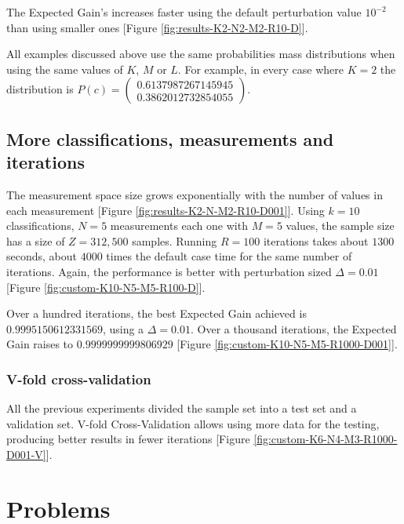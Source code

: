 \documentclass[letterpaper, conference]{IEEEtran}
\begin{document}
The Expected Gain's increases faster using the default perturbation value $10^{-2}$ than using smaller ones [Figure \ref{fig:results-K2-N2-M2-R10-D}].



All examples discussed above use the same probabilities mass distributions when using the same values of $K$, $M$ or $L$. For example, in every case where $K = 2$ the distribution is $P(c) = \begin{pmatrix}0.6137987267145945\\0.3862012732854055\end{pmatrix}$.

\subsection{More classifications, measurements and iterations}

The measurement space size grows exponentially with the number of values in each measurement [Figure \ref{fig:results-K2-N-M2-R10-D001}]. Using $k =10$ classifications, $N = 5$ measurements each one with $M = 5$ values, the sample size has a size of $Z = 312,500$ samples. Running $R = 100$ iterations takes about $1300$ seconds, about $4000$ times the default case time for the same number of iterations. Again, the performance is better with perturbation sized $\Delta = 0.01$ [Figure \ref{fig:custom-K10-N5-M5-R100-D}].



Over a hundred iterations, the best Expected Gain achieved is $0.9995150612331569$, using a $\Delta = 0.01$. Over a thousand iterations, the Expected Gain raises to $0.9999999999806929$ [Figure \ref{fig:custom-K10-N5-M5-R1000-D001}].




\subsubsection{V-fold cross-validation}

All the previous experiments divided the sample set into a test set and a validation set. V-fold Cross-Validation allows using more data for the testing, producing better results in fewer iterations [Figure \ref{fig:custom-K6-N4-M3-R1000-D001-V}].



\section{Problems}\label{problems}
\end{document}
